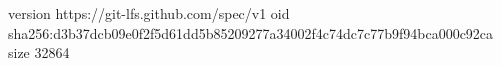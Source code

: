 version https://git-lfs.github.com/spec/v1
oid sha256:d3b37dcb09e0f2f5d61dd5b85209277a34002f4c74dc7c77b9f94bca000c92ca
size 32864
